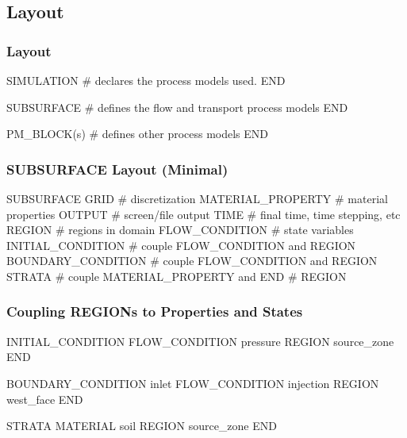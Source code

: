 \subsection{Layout}

\begin{frame}\frametitle{Layout}

\begin{semiverbatim}
  SIMULATION
    # declares the process models used.
  END

  SUBSURFACE
    # defines the flow and transport process models
  END
  
  PM_BLOCK(s)
    # defines other process models
  END

\end{semiverbatim}

\end{frame}

\begin{frame}\frametitle{SUBSURFACE Layout (Minimal)}

\begin{semiverbatim}
  SUBSURFACE
    GRID               # discretization
    MATERIAL_PROPERTY  # material properties
    OUTPUT             # screen/file output
    TIME               # final time, time stepping, etc
    REGION             # regions in domain
    FLOW_CONDITION     # state variables
    INITIAL_CONDITION  # couple FLOW_CONDITION and REGION
    BOUNDARY_CONDITION # couple FLOW_CONDITION and REGION
    STRATA             # couple MATERIAL_PROPERTY and
  END                  #   REGION
\end{semiverbatim}

\end{frame}

\begin{frame}\frametitle{Coupling REGIONs to Properties and States}

\begin{semiverbatim}
  INITIAL_CONDITION
    FLOW_CONDITION pressure
    REGION source_zone
  END
  
  BOUNDARY_CONDITION inlet
    FLOW_CONDITION injection
    REGION west_face
  END
  
  STRATA
    MATERIAL soil
    REGION source_zone
  END
\end{semiverbatim}

\end{frame}